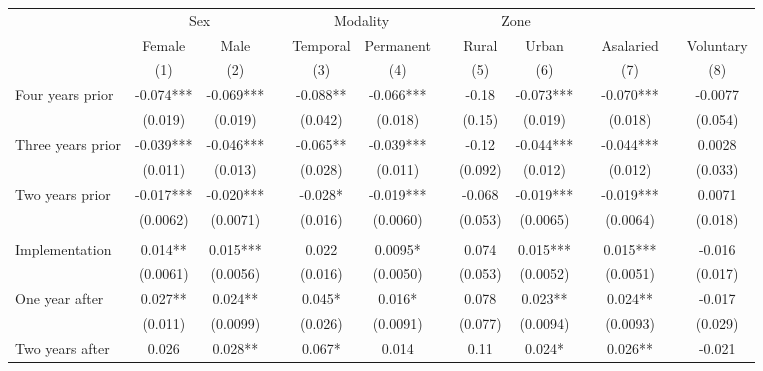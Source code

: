 \begin{tabular}{lcccccccccccc}
\toprule
      & \multicolumn{2}{c}{Sex} &       & \multicolumn{2}{c}{Modality} &       & \multicolumn{2}{c}{Zone} &       &       &       &  \\
\cmidrule{2-3}\cmidrule{5-6}\cmidrule{8-9}      & Female & Male  &       & Temporal & Permanent &       & Rural  & Urban &       & Asalaried &       & Voluntary \\
\midrule
      & (1)   & (2)   &       & (3)   & (4)   &       & (5)   & (6)   &       & (7)   &       & (8) \\
\midrule
\midrule
Four years prior & -0.074*** & -0.069*** &       & -0.088** & -0.066*** &       & -0.18 & -0.073*** &       & -0.070*** &       & -0.0077 \\
      & (0.019) & (0.019) &       & (0.042) & (0.018) &       & (0.15) & (0.019) &       & (0.018) &       & (0.054) \\
Three years prior & -0.039*** & -0.046*** &       & -0.065** & -0.039*** &       & -0.12 & -0.044*** &       & -0.044*** &       & 0.0028 \\
      & (0.011) & (0.013) &       & (0.028) & (0.011) &       & (0.092) & (0.012) &       & (0.012) &       & (0.033) \\
Two years prior & -0.017*** & -0.020*** &       & -0.028* & -0.019*** &       & -0.068 & -0.019*** &       & -0.019*** &       & 0.0071 \\
      & (0.0062) & (0.0071) &       & (0.016) & (0.0060) &       & (0.053) & (0.0065) &       & (0.0064) &       & (0.018) \\
      &       &       &       &       &       &       &       &       &       &       &       &  \\
Implementation & 0.014** & 0.015*** &       & 0.022 & 0.0095* &       & 0.074 & 0.015*** &       & 0.015*** &       & -0.016 \\
      & (0.0061) & (0.0056) &       & (0.016) & (0.0050) &       & (0.053) & (0.0052) &       & (0.0051) &       & (0.017) \\
One year after & 0.027** & 0.024** &       & 0.045* & 0.016* &       & 0.078 & 0.023** &       & 0.024** &       & -0.017 \\
      & (0.011) & (0.0099) &       & (0.026) & (0.0091) &       & (0.077) & (0.0094) &       & (0.0093) &       & (0.029) \\
Two years after & 0.026 & 0.028** &       & 0.067* & 0.014 &       & 0.11  & 0.024* &       & 0.026** &       & -0.021 \\

\end{tabular}
